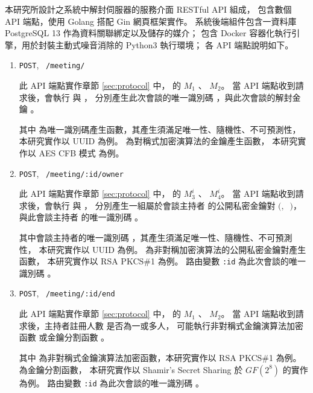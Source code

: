     本研究所設計之系統中解封伺服器的服務介面 RESTful\cite{fielding2000architectural} API 組成，
包含數個 API 端點，使用 Golang 搭配 Gin 網頁框架實作。
系統後端組件包含一資料庫 PostgreSQL 13 作為資料關聯綁定以及儲存的媒介；
包含 Docker 容器化執行引擎，用於封裝主動式噪音消除的 Python3 執行環境；
各 API 端點說明如下。

\begin{enumerate}
    \item \texttt{POST},~ \texttt{/meeting/}

        此 API 端點實作章節 \ref{sec:protocol} 中，
     的 $M_{1}$ 、 $M_{2}$。
    當 API 端點收到請求後，會執行 \DEFfuncIDgen{} 與 \DEFfuncKgen{}，
    分別產生此次會談的唯一識別碼 \DEFsessionID，與此次會談的解封金鑰 \DEFunsealKey。

        其中 \DEFfuncIDgen{} 為唯一識別碼產生函數，其產生須滿足唯一性、隨機性、不可預測性，
    本研究實作以 UUID \cite{rfc4122} 為例。
    \DEFfuncKgen{} 為對稱式加密演算法的金鑰產生函數，
    本研究實作以 AES CFB 模式 \cite{117146}\cite{9171} 為例。

    \item \texttt{POST},~ \texttt{/meeting/:id/owner}

        此 API 端點實作章節 \ref{sec:protocol} 中，
     的 $M_{3}^{i}$ 、 $M_{4}^{i}$。
    當 API 端點收到請求後，會執行 \DEFfuncPKgen{} 與 \DEFfuncIDgen{}，
    分別產生一組屬於會談主持者 \DEFowner 的公開私密金鑰對 $($\DEFpublicKey$,~$ \DEFprivateKey$)$，
    與此會談主持者 \DEFowner 的唯一識別碼 \DEFownerID。

        其中會談主持者的唯一識別碼 \DEFownerID，其產生須滿足唯一性、隨機性、不可預測性，
    本研究實作以 UUID \cite{rfc4122} 為例。
    \DEFfuncPKgen{} 為非對稱加密演算法的公開私密金鑰對產生函數，
    本研究實作以 RSA PKCS\#1 \cite{rfc8017} 為例。
    路由變數 \texttt{:id} 為此次會談的唯一識別碼 \DEFsessionID。

    \item \texttt{POST},~ \texttt{/meeting/:id/end}

        此 API 端點實作章節 \ref{sec:protocol} 中，
     的 $M_{1}$ 、 $M_{2}$。
    當 API 端點收到請求後，主持者註冊人數 \DEFowreg 是否為一或多人，
    可能執行非對稱式金鑰演算法加密函數 \DEFfuncEncPK{} 或金鑰分割函數 \DEFfuncSSS{}。

        其中 \DEFfuncEncPK{} 為非對稱式金鑰演算法加密函數，本研究實作以 RSA PKCS\#1 \cite{rfc8017} 為例。
    \DEFfuncSSS{} 為金鑰分割函數，
    本研究實作以 Shamir's Secret Sharing \cite{shamir1979share} 於 $GF(2^8)$ 的實作 \cite{117146} 為例。
    路由變數 \texttt{:id} 為此次會談的唯一識別碼 \DEFsessionID。


\end{enumerate}

